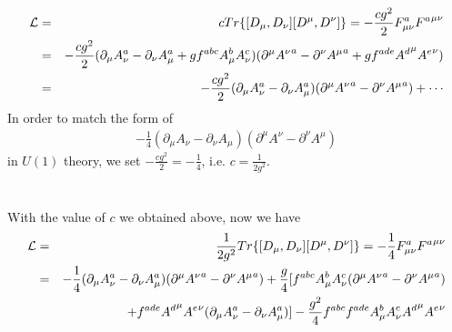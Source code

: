 \documentclass[11pt]{article}
\def\del{{\partial}}
\begin{document}
\section{ }
\begin{eqnarray}
    {\cal L} &=& c Tr\{ [D_\mu,D_\nu] [D^\mu,D^\nu] \} = -\frac{cg^2}{2} F^a_{\mu\nu} {F^a}^{\mu\nu} \\
    &=& -\frac{cg^2}{2} (\del_\mu A_\nu^a-\del_\nu A_\mu^a+g f^{abc} A^b_\mu A^c_\nu)(\del^\mu {A^\nu}^a-\del^\nu {A^\mu}^a+g f^{ade} {A^d}^\mu {A^e}^\nu) \\
    &=& -\frac{cg^2}{2} (\del_\mu A_\nu^a-\del_\nu A_\mu^a)(\del^\mu {A^\nu}^a-\del^\nu {A^\mu}^a) + \cdots
\end{eqnarray}
In order to match the form of
\begin{eqnarray}
    -\frac{1}{4} (\del_\mu A_\nu-\del_\nu A_\mu)(\del^\mu {A^\nu}-\del^\nu {A^\mu})
\end{eqnarray}
in $U(1)$ theory, we set $-\frac{cg^2}{2}=-\frac{1}{4}$, i.e. $c= \frac{1}{2g^2}$.

\section{ }
With the value of $c$ we obtained above, now we have
\begin{eqnarray}
    {\cal L} &=& \frac{1}{2g^2} Tr\{ [D_\mu,D_\nu] [D^\mu,D^\nu] \} = -\frac{1}{4} F^a_{\mu\nu} {F^a}^{\mu\nu} \\
    &=& -\frac{1}{4}  (\del_\mu A_\nu^a-\del_\nu A_\mu^a)(\del^\mu {A^\nu}^a-\del^\nu {A^\mu}^a) + \frac{g}{4}[f^{abc} A^b_\mu A^c_\nu (\del^\mu {A^\nu}^a-\del^\nu {A^\mu}^a) \nonumber \\
    && + f^{ade} {A^d}^\mu {A^e}^\nu (\del_\mu A_\nu^a-\del_\nu A_\mu^a)]-\frac{g^2}{4} f^{abc} f^{ade} A^b_\mu A^c_\nu {A^d}^\mu {A^e}^\nu
\end{eqnarray}
\end{document}
